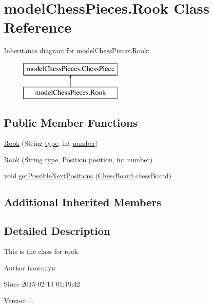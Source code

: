 \hypertarget{classmodel_chess_pieces_1_1_rook}{\section{model\+Chess\+Pieces.\+Rook Class Reference}
\label{classmodel_chess_pieces_1_1_rook}
}
Inheritance diagram for model\+Chess\+Pieces.\+Rook\+:\begin{figure}[H]
\begin{center}
\leavevmode
\includegraphics[height=2.000000cm]{classmodel_chess_pieces_1_1_rook}
\end{center}
\end{figure}
\subsection*{Public Member Functions}
\begin{DoxyCompactItemize}
\item 
\hyperlink{classmodel_chess_pieces_1_1_rook_a7cef743a515cb9ea132e09c99060cc96}{Rook} (String \hyperlink{classmodel_chess_pieces_1_1_chess_piece_a195487ca88c197af7c1604247be31db2}{type}, int \hyperlink{classmodel_chess_pieces_1_1_chess_piece_a979e63b99128333883acedc38d25dc87}{number})
\item 
\hyperlink{classmodel_chess_pieces_1_1_rook_af2c466d81052c7adcbb443d235aecdb6}{Rook} (String \hyperlink{classmodel_chess_pieces_1_1_chess_piece_a195487ca88c197af7c1604247be31db2}{type}, \hyperlink{classmodel_core_1_1_position}{Position} \hyperlink{classmodel_chess_pieces_1_1_chess_piece_a3d4362d5b28f6edb14161196d9c6807d}{position}, int \hyperlink{classmodel_chess_pieces_1_1_chess_piece_a979e63b99128333883acedc38d25dc87}{number})
\item 
void \hyperlink{classmodel_chess_pieces_1_1_rook_a7b58bb763c43a1118b99354514e5c7c4}{get\+Possible\+Next\+Positions} (\hyperlink{classmodel_core_1_1_chess_board}{Chess\+Board} chess\+Board)
\end{DoxyCompactItemize}
\subsection*{Additional Inherited Members}


\subsection{Detailed Description}
This is the class for rook \begin{DoxyAuthor}{Author}
haoranyu 
\end{DoxyAuthor}
\begin{DoxySince}{Since}
2015-\/02-\/13 01\+:19\+:42 
\end{DoxySince}
\begin{DoxyVersion}{Version}
1. 
\end{DoxyVersion}


